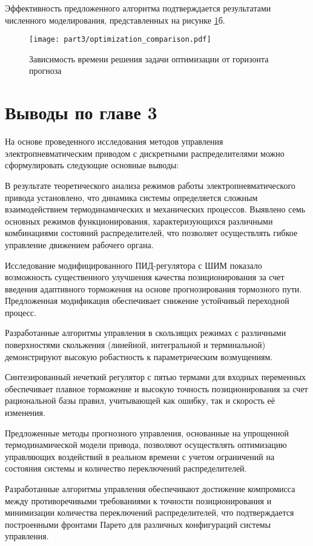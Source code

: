 Эффективность предложенного алгоритма подтверждается результатами численного моделирования, представленных на рисунке \ref{fig:opt_compar}б.

\begin{figure}[ht]
	\centering
	\texttt{[image: part3/optimization\_comparison.pdf]}
	\caption{Зависимость времени решения задачи оптимизации от горизонта прогноза}\label{fig:opt_compar}
\end{figure}

\section{Выводы по главе 3}
На основе проведенного исследования методов управления электропневматическим приводом с дискретными распределителями можно сформулировать следующие основные выводы:

В результате теоретического анализа режимов работы электропневматического привода установлено, что динамика системы определяется сложным взаимодействием термодинамических и
механических процессов. Выявлено семь основных режимов функционирования, характеризующихся различными комбинациями состояний распределителей, что позволяет осуществлять
гибкое управление движением рабочего органа.

Исследование модифицированного ПИД-регулятора с ШИМ показало возможность существенного улучшения качества позиционирования за счет
введения адаптивного торможения на основе прогнозирования тормозного пути. Предложенная модификация обеспечивает снижение устойчивый переходной процесс.

Разработанные алгоритмы управления в скользящих режимах с различными поверхностями скольжения (линейной, интегральной и терминальной) демонстрируют
высокую робастность к параметрическим возмущениям.

Синтезированный нечеткий регулятор с пятью термами для входных переменных обеспечивает плавное торможение и высокую точность позиционирования за счет
рациональной базы правил, учитывающей как ошибку, так и скорость её изменения.

Предложенные методы прогнозного управления, основанные на упрощенной термодинамической модели привода, позволяют осуществлять
оптимизацию управляющих воздействий в реальном времени с учетом ограничений на состояния системы и количество переключений распределителей.

Разработанные алгоритмы управления обеспечивают достижение компромисса между противоречивыми требованиями к точности позиционирования и
минимизации количества переключений распределителей, что подтверждается построенными фронтами Парето для различных конфигураций системы управления.




